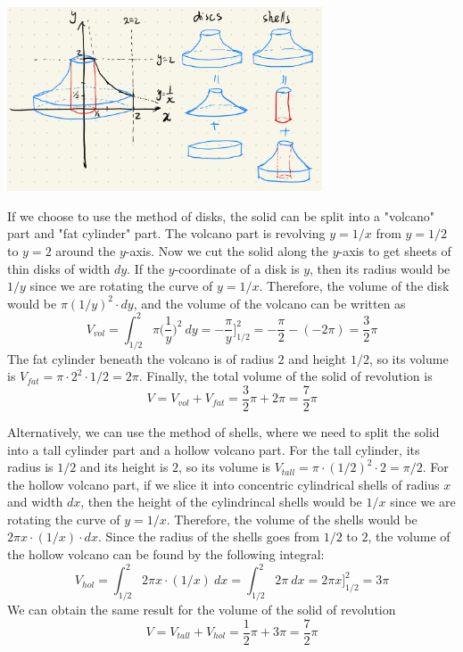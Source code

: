 \documentclass[11pt,letterpaper]{article}
\begin{document}
\begin{center}
    \includegraphics[width = 0.7\textwidth]{sol_rotate_y.png}
\end{center}

If we choose to use the method of disks, the solid can be split into a "volcano" part and "fat cylinder" part.  The volcano part is revolving $y=1/x$ from $y=1/2$ to $y=2$ around the $y$-axis.  Now we cut the solid along the $y$-axis to get sheets of thin disks of width $dy$.  If the $y$-coordinate of a disk is $y$, then its radius would be $1/y$ since we are rotating the curve of $y=1/x$.  Therefore, the volume of the disk would be $\pi (1/y)^2 \cdot dy$, and the volume of the volcano can be written as
\[V_{vol} = \int_{1/2}^2 \pi \Big(\frac{1}{y}\Big)^2~dy = -\frac{\pi}{y}\Big]_{1/2}^2 = -\frac{\pi}{2} - (-2\pi) = \frac{3}{2}\pi\]
The fat cylinder beneath the volcano is of radius $2$ and height $1/2$, so its volume is $V_{fat} = \pi \cdot 2^2 \cdot 1/2 = 2\pi$.  Finally, the total volume of the solid of revolution is 
\[V = V_{vol} + V_{fat} = \frac{3}{2}\pi + 2\pi = \frac{7}{2}\pi\]

Alternatively, we can use the method of shells, where we need to split the solid into a tall cylinder part and a hollow volcano part.  For the tall cylinder, its radius is $1/2$ and its height is $2$, so its volume is $V_{tall} = \pi \cdot (1/2)^2 \cdot 2 = \pi/2$.  For the hollow volcano part, if we slice it into concentric cylindrical shells of radius $x$ and width $dx$, then the height of the cylindrincal shells would be $1/x$ since we are rotating the curve of $y=1/x$.  Therefore, the volume of the shells would be $2\pi x \cdot (1/x) \cdot dx$.  Since the radius of the shells goes from $1/2$ to $2$, the volume of the hollow volcano can be found by the following integral:
\[V_{hol} = \int_{1/2}^2 2\pi x \cdot (1/x)~ dx = \int_{1/2}^2 2\pi~dx = 2\pi x\big]_{1/2}^2 = 3\pi\]
We can obtain the same result for the volume of the solid of revolution
\[V = V_{tall} + V_{hol} = \frac{1}{2}\pi + 3\pi = \frac{7}{2}\pi\]
\end{document}
